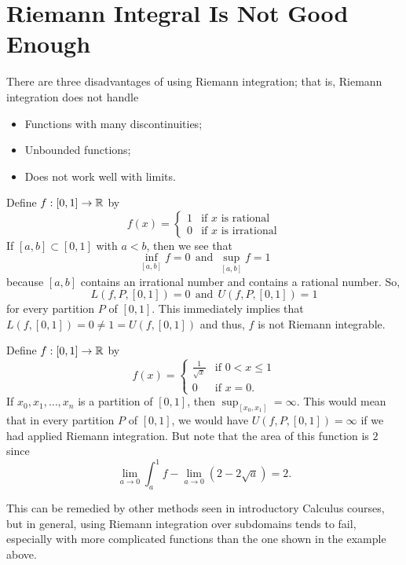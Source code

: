 \documentclass[11pt,a4paper]{book}
\begin{document}
    
\section{Riemann Integral Is Not Good Enough}

There are three disadvantages of using Riemann integration; that is, Riemann integration does not handle 
\begin{itemize}
    \item Functions with many discontinuities;
    \item Unbounded functions;
    \item Does not work well with limits.
\end{itemize}

\begin{eg}
    Define \( f: [0,1] \to \mathbb{R}  \) by 
    \[  f(x) = 
    \begin{cases}
        1 & \text{if } x \text{ is rational} \\
        0 & \text{if } x \text{ is irrational}
    \end{cases}   \]
    If \( [a,b] \subset [0,1] \) with \( a < b  \), then we see that
    \[ \inf_{[a,b]} f = 0 \ \ \text{and} \ \ \sup_{[a,b]} f = 1 \]
    because \( [a,b] \) contains an irrational number and contains a rational number. So, 
    \[  L(f,P,[0,1]) = 0  \ \ \text{and} \ \ U(f,P,[0,1]) = 1 \]
    for every partition \( P  \) of \( [0,1] \). This immediately implies that \( L(f,[0,1]) = 0 \neq 1 = U(f,[0,1]) \) and thus, \( f  \) is not Riemann integrable.
\end{eg}

\begin{eg}
    Define \( f: [0,1] \to \mathbb{R}  \) by 
    \[  f(x) = 
    \begin{cases}
        \frac{ 1 }{ \sqrt{ x }  }  & \text{if } 0 < x \leq 1 \\
        0 & \text{if } x = 0. 
    \end{cases} \]
    If \( {x}_{0}, {x}_{1}, \dots, {x}_{n} \) is a partition of \( [0,1] \), then \( \sup_{[{x}_{0},{x}_{1}]} = \infty  \). This would mean that in every partition \( P \) of \( [0,1] \), we would have \( U(f,P,[0,1]) = \infty  \) if we had applied Riemann integration. But note that the area of this function is \( 2 \) since 
    \[  \lim_{ a \to 0 }  \int_{ a }^{ 1 }  f  - \lim_{ a \to 0 }  (2 - 2 \sqrt{ a } ) = 2. \]
\end{eg}
This can be remedied by other methods seen in introductory Calculus courses, but in general, using Riemann integration over subdomains tends to fail, especially with more complicated functions than the one shown in the example above.
\end{document}
